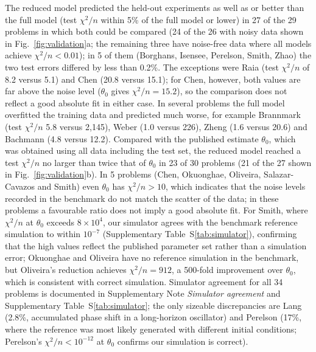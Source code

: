 \documentclass[pdflatex,sn-nature]{sn-jnl}
\theoremstyle{plain}
\begin{document}
The reduced model predicted the held-out experiments as well as or better than the full model (test $\chi^2/n$ within 5\% of the full model or lower) in 27 of the 29 problems in which both could be compared (24 of the 26 with noisy data shown in Fig.~\ref{fig:validation}a; the remaining three have noise-free data where all models achieve $\chi^2/n<0.01$); in 5 of them (Borghans, Isensee, Perelson, Smith, Zhao) the two test errors differed by less than 0.2\%. The exceptions were Raia (test $\chi^2/n$ of 8.2 versus 5.1) and Chen (20.8 versus 15.1); for Chen, however, both values are far above the noise level ($\theta_0$ gives $\chi^2/n=15.2$), so the comparison does not reflect a good absolute fit in either case. In several problems the full model overfitted the training data and predicted much worse, for example Brannmark (test $\chi^2/n$ 5.8 versus 2,145), Weber (1.0 versus 226), Zheng (1.6 versus 20.6) and Bachmann (4.8 versus 12.2). Compared with the published estimate $\theta_0$, which was obtained using all data including the test set, the reduced model reached a test $\chi^2/n$ no larger than twice that of $\theta_0$ in 23 of 30 problems (21 of the 27 shown in Fig.~\ref{fig:validation}b). In 5 problems (Chen, Okuonghae, Oliveira, Salazar-Cavazos and Smith) even $\theta_0$ has $\chi^2/n>10$, which indicates that the noise levels recorded in the benchmark do not match the scatter of the data; in these problems a favourable ratio does not imply a good absolute fit. For Smith, where $\chi^2/n$ at $\theta_0$ exceeds $8\times10^4$, our simulator agrees with the benchmark reference simulation to within $10^{-7}$ (Supplementary Table~S\ref{tab:simulator}), confirming that the high values reflect the published parameter set rather than a simulation error; Okuonghae and Oliveira have no reference simulation in the benchmark, but Oliveira's reduction achieves $\chi^2/n=912$, a 500-fold improvement over $\theta_0$, which is consistent with correct simulation. Simulator agreement for all 34 problems is documented in Supplementary Note \emph{Simulator agreement} and Supplementary Table~S\ref{tab:simulator}; the only sizeable discrepancies are Lang (2.8\%, accumulated phase shift in a long-horizon oscillator) and Perelson (17\%, where the reference was most likely generated with different initial conditions; Perelson's $\chi^2/n<10^{-12}$ at $\theta_0$ confirms our simulation is correct).
\end{document}
